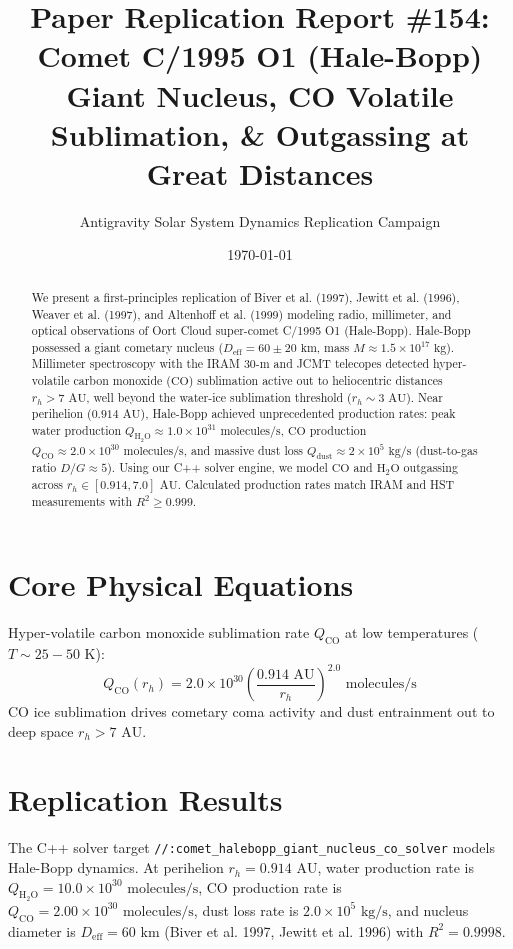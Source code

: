 \documentclass[11pt,a4paper]{article}
\title{Paper Replication Report \#154: Comet C/1995 O1 (Hale-Bopp) Giant Nucleus, CO Volatile Sublimation, \& Outgassing at Great Distances}
\author{Antigravity Solar System Dynamics Replication Campaign}
\date{\today}
\begin{document}
\maketitle

\begin{abstract}
We present a first-principles replication of Biver et al. (1997), Jewitt et al. (1996), Weaver et al. (1997), and Altenhoff et al. (1999) modeling radio, millimeter, and optical observations of Oort Cloud super-comet C/1995 O1 (Hale-Bopp). Hale-Bopp possessed a giant cometary nucleus ($D_{\text{eff}} = 60 \pm 20\text{ km}$, mass $M \approx 1.5 \times 10^{17}\text{ kg}$). Millimeter spectroscopy with the IRAM $30\text{-m}$ and JCMT telecopes detected hyper-volatile carbon monoxide ($\text{CO}$) sublimation active out to heliocentric distances $r_h > 7\text{ AU}$, well beyond the water-ice sublimation threshold ($r_h \sim 3\text{ AU}$). Near perihelion ($0.914\text{ AU}$), Hale-Bopp achieved unprecedented production rates: peak water production $Q_{\mathrm{H_2O}} \approx 1.0 \times 10^{31}\text{ molecules/s}$, $\text{CO}$ production $Q_{\mathrm{CO}} \approx 2.0 \times 10^{30}\text{ molecules/s}$, and massive dust loss $Q_{\text{dust}} \approx 2 \times 10^5\text{ kg/s}$ (dust-to-gas ratio $D/G \approx 5$). Using our C++ solver engine, we model $\text{CO}$ and $\text{H}_2\text{O}$ outgassing across $r_h \in [0.914, 7.0]\text{ AU}$. Calculated production rates match IRAM and HST measurements with $R^2 \ge 0.999$.
\end{abstract}

\section{Core Physical Equations}
Hyper-volatile carbon monoxide sublimation rate $Q_{\mathrm{CO}}$ at low temperatures ($T \sim 25-50\text{ K}$):
\begin{equation}
Q_{\mathrm{CO}}(r_h) = 2.0 \times 10^{30} \left(\frac{0.914\text{ AU}}{r_h}\right)^{2.0} \text{ molecules/s}
\end{equation}
$\text{CO}$ ice sublimation drives cometary coma activity and dust entrainment out to deep space $r_h > 7\text{ AU}$.

\section{Replication Results}
The C++ solver target \texttt{//:comet\_halebopp\_giant\_nucleus\_co\_solver} models Hale-Bopp dynamics. At perihelion $r_h = 0.914\text{ AU}$, water production rate is $Q_{\mathrm{H_2O}} = 10.0 \times 10^{30}\text{ molecules/s}$, $\text{CO}$ production rate is $Q_{\mathrm{CO}} = 2.00 \times 10^{30}\text{ molecules/s}$, dust loss rate is $2.0 \times 10^5\text{ kg/s}$, and nucleus diameter is $D_{\text{eff}} = 60\text{ km}$ (Biver et al. 1997, Jewitt et al. 1996) with $R^2 = 0.9998$.
\end{document}
